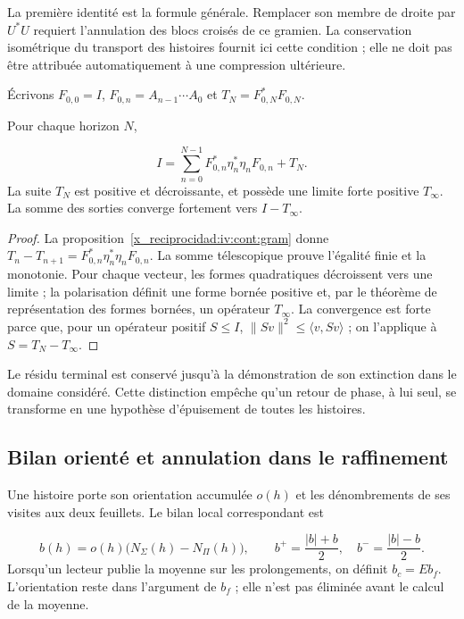 La première identité est la formule générale. Remplacer son membre de droite par \(U^*U\) requiert l'annulation des blocs croisés de ce gramien. La conservation isométrique du transport des histoires fournit ici cette condition ; elle ne doit pas être attribuée automatiquement à une compression ultérieure.

Écrivons \(F_{0,0}=I\), \(F_{0,n}=A_{n-1}\cdots A_0\) et \(T_N=F_{0,N}^*F_{0,N}\).

\begin{theorem}
\label{x_reciprocidad:iv:cont:terminal}
Pour chaque horizon \(N\),

\[
I=\sum_{n=0}^{N-1}
F_{0,n}^*\eta_n^*\eta_nF_{0,n}+T_N.
\]
La suite \(T_N\) est positive et décroissante, et possède une limite forte positive \(T_\infty\). La somme des sorties converge fortement vers \(I-T_\infty\).

\end{theorem}
\begin{proof}
La proposition~\ref{x_reciprocidad:iv:cont:gram} donne \(T_n-T_{n+1}=F_{0,n}^*\eta_n^*\eta_nF_{0,n}\). La somme télescopique prouve l'égalité finie et la monotonie. Pour chaque vecteur, les formes quadratiques décroissent vers une limite ; la polarisation définit une forme bornée positive et, par le théorème de représentation des formes bornées, un opérateur \(T_\infty\). La convergence est forte parce que, pour un opérateur positif \(S\leq I\), \(\|Sv\|^2\leq\langle v,Sv\rangle\) ; on l'applique à \(S=T_N-T_\infty\).
\end{proof}

Le résidu terminal est conservé jusqu'à la démonstration de son extinction dans le domaine considéré. Cette distinction empêche qu'un retour de phase, à lui seul, se transforme en une hypothèse d'épuisement de toutes les histoires.

\subsection{Bilan orienté et annulation dans le raffinement}
\label{x_reciprocidad:iv:cont:balance}
Une histoire porte son orientation accumulée \(o(h)\) et les dénombrements de ses visites aux deux feuillets. Le bilan local correspondant est

\[
b(h)=o(h)\bigl(N_\Sigma(h)-N_\Pi(h)\bigr),
\qquad
b^+=\frac{|b|+b}{2},\quad b^-=\frac{|b|-b}{2}.
\]
Lorsqu'un lecteur publie la moyenne sur les prolongements, on définit \(b_c=Eb_f\). L'orientation reste dans l'argument de \(b_f\) ; elle n'est pas éliminée avant le calcul de la moyenne.

